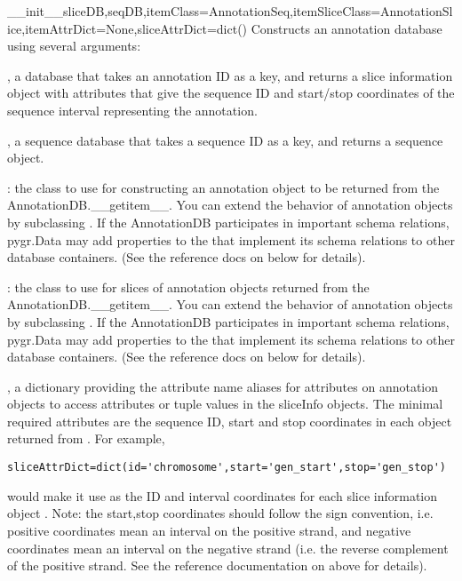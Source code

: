 \documentclass{howto}
\begin{document}
\begin{funcdesc}{__init__}{sliceDB,seqDB,itemClass=AnnotationSeq,itemSliceClass=AnnotationSlice,itemAttrDict=None,sliceAttrDict=dict()}
  Constructs an annotation database using several arguments:

  , a database that takes an annotation ID as a key, and returns
  a slice information object with attributes that give the sequence ID and start/stop
  coordinates of the sequence interval representing the annotation.

  , a sequence database that takes a sequence ID as a key, and
  returns a sequence object.

  : the class to use for constructing an annotation object 
  to be returned from the AnnotationDB.__getitem__.  You can extend the
  behavior of annotation objects by subclassing .
  If the AnnotationDB participates in important schema relations,
  pygr.Data may add properties to the  that implement
  its schema relations to other database containers.  (See the reference
  docs on  below for details).

  : the class to use for slices of annotation
  objects returned from the AnnotationDB.__getitem__.  You can extend the
  behavior of annotation objects by subclassing .
  If the AnnotationDB participates in important schema relations,
  pygr.Data may add properties to the  that implement
  its schema relations to other database containers.  (See the reference
  docs on  below for details).

  , a dictionary providing the attribute name aliases
  for attributes on annotation objects to access attributes or tuple values
  in the sliceInfo objects.  The minimal required attributes are the
  sequence ID, start and stop coordinates in each object returned from .
  For example,
\begin{verbatim}
sliceAttrDict=dict(id='chromosome',start='gen_start',stop='gen_stop')
\end{verbatim}
  would make it use  as the ID and interval
  coordinates for each slice information object .  Note: the start,stop
  coordinates should follow the  sign convention, i.e. positive
  coordinates mean an interval on the positive strand, and negative coordinates
  mean an interval on the negative strand (i.e. the reverse complement of
  the positive strand.  See the reference documentation on  above
  for details).


\end{funcdesc}
\end{document}
